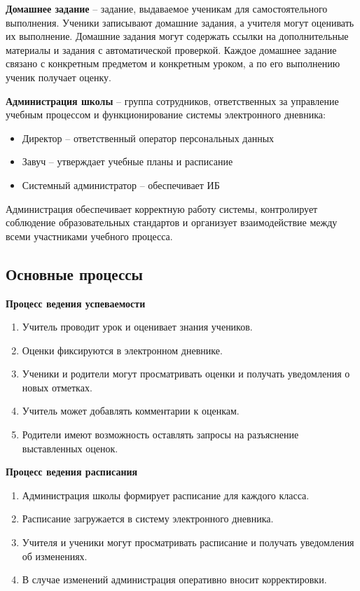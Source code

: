 \documentclass[a4paper, final]{article}
\begin{document}
\textbf{Домашнее задание} -- задание, выдаваемое ученикам для самостоятельного выполнения. Ученики записывают домашние задания, а учителя могут оценивать их выполнение. Домашние задания могут содержать ссылки на дополнительные материалы и задания с автоматической проверкой. Каждое домашнее задание связано с конкретным предметом и конкретным уроком, а по его выполнению ученик получает оценку.

\textbf{Администрация школы} -- группа сотрудников, ответственных за управление учебным процессом и функционирование системы электронного дневника:
\begin{itemize}
  \item Директор -- ответственный оператор персональных данных
  \item Завуч -- утверждает учебные планы и расписание
  \item Системный администратор -- обеспечивает ИБ
\end{itemize}

Администрация обеспечивает корректную работу системы, контролирует соблюдение образовательных стандартов и организует взаимодействие между всеми участниками учебного процесса.

\subsection{Основные процессы}
\noindent \textbf{Процесс ведения успеваемости}
\begin{enumerate}
  \item Учитель проводит урок и оценивает знания учеников.
  \item Оценки фиксируются в электронном дневнике.
  \item Ученики и родители могут просматривать оценки и получать уведомления о новых отметках.
  \item Учитель может добавлять комментарии к оценкам.
  \item Родители имеют возможность оставлять запросы на разъяснение выставленных оценок.
\end{enumerate}

\noindent \textbf{Процесс ведения расписания}
\begin{enumerate}
  \item Администрация школы формирует расписание для каждого класса.
  \item Расписание загружается в систему электронного дневника.
  \item Учителя и ученики могут просматривать расписание и получать уведомления об изменениях.
  \item В случае изменений администрация оперативно вносит корректировки.
\end{enumerate}
\end{document}

